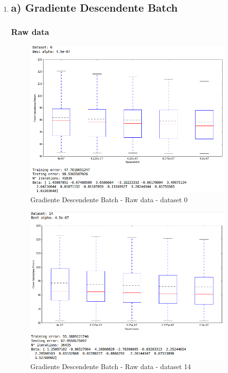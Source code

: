 \documentclass[spanish, fleqn]{article}
\begin{document}
\begin{enumerate}
\item 

\subsection*{a) Gradiente Descendente Batch}

\subsubsection*{Raw data}

\begin{figure}[!htpb]
\centering
 \includegraphics[scale=0.45]{gd_batch_raw0.png}
 \caption{Gradiente Descendente Batch - Raw data - dataset 0}
\end{figure}

\begin{figure}[!htpb]
\centering
 \includegraphics[scale=0.45]{gd_batch_raw14.png}
 \caption{Gradiente Descendente Batch - Raw data - dataset 14}
\end{figure}


\end{enumerate}
\end{document}
